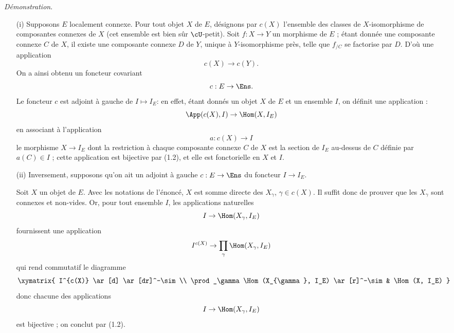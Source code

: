 {\it Démonstration}.
\begin{enumerate}
    \item[(i)] Supposons $E$ localement connexe. Pour tout objet $X$ de $E$, désignons par $c(X)$ l'ensemble des classes de $X$-isomorphisme de composantes connexes de $X$ (cet ensemble est bien sûr $\cU$-petit). Soit $f: X \to Y$ un morphisme de $E$ ; étant donnée une composante connexe $C$ de $X$, il existe une composante connexe $D$ de $Y$, unique à $Y$-isomorphisme près, telle que $f_{/C}$ se factorise par $D$. D'où une application
    $$
    c(X) \to c(Y).
    $$
    On a ainsi obtenu un foncteur covariant
    $$
    c: E \to \Ens.
    $$
    Le foncteur $c$ est adjoint à gauche de $I \mapsto I_E$: en effet, étant donnés un objet $X$ de $E$ et un ensemble $I$, on définit une application : 
    $$
    \App(c(X), I) \to \Hom(X, I_E)
    $$
    en associant à l'application
    $$
    a: c(X) \to I
    $$
    le morphisme $X \to I_E$ dont la restriction à chaque composante connexe $C$ de $X$ est la section de $I_E$ au-dessus de $C$ définie par $a(C) \in I$ ; cette application est bijective par (1.2), et elle est fonctorielle en $X$ et $I$.
    \item[(ii)] Inversement, supposons qu'on ait un adjoint à gauche $c: E \to \Ens$ du foncteur $I \to I_E$.
    
    Soit $X$ un objet de $E$. Avec les notations de l'énoncé, $X$ est somme directe des $X_{\gamma}$, $\gamma \in c(X)$. Il suffit donc de prouver que les $X_{\gamma}$ sont connexes et non-vides. Or, pour tout ensemble $I$, les applications naturelles
    $$
    I \to \Hom(X_{\gamma}, I_E)
    $$
    fournissent une application
    $$
    I^{c(X)} \to \prod_\gamma \Hom(X_{\gamma}, I_E)
    $$
    qui rend commutatif le diagramme
    \[
        \xymatrix{
        I^{c(X)} \ar[d] \ar[dr]^-\sim \\
        \prod_\gamma \Hom(X_{\gamma}, I_E) \ar[r]^-\sim & \Hom(X, I_E)
        }
    \]
    donc chacune des applications
    $$
    I \to \Hom(X_{\gamma}, I_E)
    $$
    est bijective ; on conclut par (1.2).
\end{enumerate}
